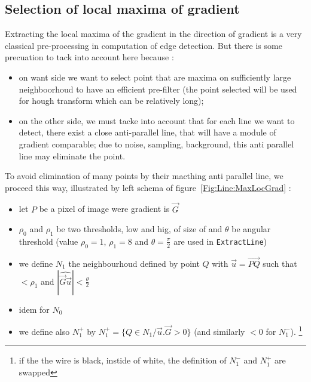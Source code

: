 \subsection{Selection of local maxima of gradient}

\label{Line:LocMaxGrad}

Extracting the local maxima of the gradient in the direction of gradient is a very classical pre-processing
in computation of  edge detection.  But there is some precuation  to tack into account here because :

\begin{itemize}
   \item on want side we want to select point that are maxima on sufficiently large neighboorhoud
         to have an efficient pre-filter (the point selected will be used for hough transform which
         can be relatively long);

   \item on the other side, we must tacke into account that for each line we want to detect, there exist 
        a close anti-parallel line, that will have a module of gradient comparable; due to noise,
        sampling, background, this anti parallel line may eliminate the point.
\end{itemize}

To avoid elimination of many points by their macthing anti parallel line, we proceed this way,
illustrated by left schema of figure~\ref{Fig:Line:MaxLocGrad} :

\begin{itemize}
   \item let  $P$ be a pixel of image were gradient is $\vec G$

   \item  $\rho_0$ and $\rho_1$ be two thresholds, low and hig, of size of
          and $\theta$ be angular threshold
           (value  $\rho_0=1$, $\rho_1=8$ and $\theta=\frac{\pi}{2}$ are used in {\tt ExtractLine})

   \item  we define $N_1$  the neighbourhoud defined by point $Q$ with $\vec u = \overrightarrow{PQ}$ such
          that  $ < \rho_1$  and $ | \widehat{\vec G \vec{u}} | < \frac{\theta}{2}  $

   \item idem for $N_0$


   \item we define also $N_1^+$  by  $N_1^+ = \{Q \in N_1 / \vec u . \vec G >0\} $
          (and similarly $<0$ for $N_1^-$).
          \footnote{if the the wire is  black, instide of white, the definition
           of $N_1 ^-$ and $N_1 ^+$ are swapped}

\end{itemize}

